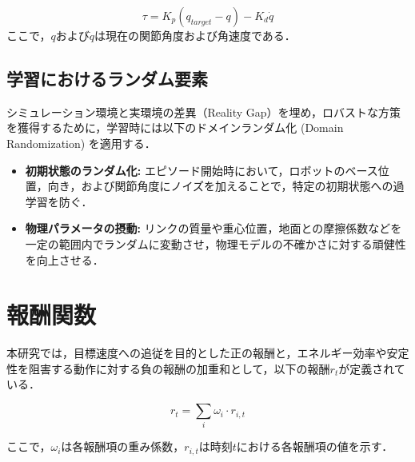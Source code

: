 \begin{equation}
  \tau = K_{p}(q_{target} - q) - K_{d}\dot{q}
\end{equation}
ここで，$q$および$\dot{q}$は現在の関節角度および角速度である．

\subsection{学習におけるランダム要素}
シミュレーション環境と実環境の差異（Reality Gap）を埋め，ロバストな方策を獲得するために，学習時には以下のドメインランダム化 (Domain Randomization) を適用する．

\begin{itemize}
    \item \textbf{初期状態のランダム化:} エピソード開始時において，ロボットのベース位置，向き，および関節角度にノイズを加えることで，特定の初期状態への過学習を防ぐ．
    \item \textbf{物理パラメータの摂動:} リンクの質量や重心位置，地面との摩擦係数などを一定の範囲内でランダムに変動させ，物理モデルの不確かさに対する頑健性を向上させる．
\end{itemize}


\section{報酬関数}
本研究では，目標速度への追従を目的とした正の報酬と，エネルギー効率や安定性を阻害する動作に対する負の報酬の加重和として，以下の報酬$r_{t}$が定義されている．

\begin{equation}
  r_{t} = \sum_{i}\omega_{i}\cdot r_{i,t}
\end{equation}

ここで，$\omega_{i}$は各報酬項の重み係数，$r_{i,t}$は時刻$t$における各報酬項の値を示す．

